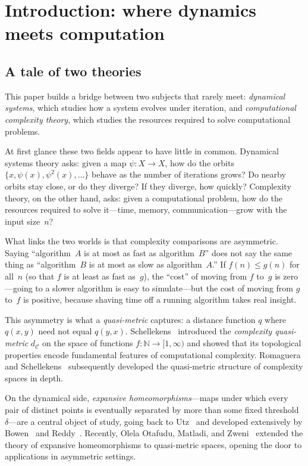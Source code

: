 \documentclass[11pt,a4paper]{article}
\theoremstyle{plain}
\theoremstyle{definition}
\newcommand{\N}{\mathbb{N}}
\newcommand{\C}{\mathcal{C}}
\begin{document}
\section{Introduction: where dynamics meets computation}
\label{sec:intro}

\subsection{A tale of two theories}

This paper builds a bridge between two subjects that rarely meet:
\emph{dynamical systems}, which studies how a system evolves under
iteration, and \emph{computational complexity theory}, which studies
the resources required to solve computational problems.

At first glance these two fields appear to have little in common.
Dynamical systems theory asks: given a map $\psi\colon X\to X$,
how do the orbits $\{x,\psi(x),\psi^2(x),\ldots\}$ behave as the
number of iterations grows?  Do nearby orbits stay close, or do they
diverge?  If they diverge, how quickly?  Complexity theory, on the
other hand, asks: given a computational problem, how do the resources
required to solve it---time, memory, communication---grow with the
input size~$n$?

What links the two worlds is that complexity comparisons are
asymmetric.  Saying ``algorithm~$A$ is at most as fast as
algorithm~$B$'' does not say the same thing as ``algorithm~$B$
is at most as slow as algorithm~$A$.''  If $f(n)\le g(n)$ for
all~$n$ (so that $f$ is at least as fast as~$g$), the ``cost'' of
moving from $f$ to~$g$ is zero---going to a slower algorithm is
easy to simulate---but the cost of moving from $g$ to~$f$ is
positive, because shaving time off a running algorithm takes real
insight.

This asymmetry is what a \emph{quasi-metric} captures: a distance
function $q$ where $q(x,y)$ need not equal $q(y,x)$.  Schellekens~\cite{schellekens1995} introduced the
\emph{complexity quasi-metric} $d_\C$ on the space of functions
$f\colon\N\to[1,\infty)$ and showed that its topological properties
encode fundamental features of computational complexity.  Romaguera
and Schellekens~\cite{romaguera1999} subsequently developed the
quasi-metric structure of complexity spaces in depth.

On the dynamical side, \emph{expansive homeomorphisms}---maps under
which every pair of distinct points is eventually separated by more
than some fixed threshold~$\delta$---are a central object of study,
going back to Utz~\cite{utz1950} and developed extensively by
Bowen~\cite{bowen1975} and Reddy~\cite{reddy1983}.  Recently, Olela
Otafudu, Matladi, and Zweni~\cite{olela2024} extended the theory of
expansive homeomorphisms to quasi-metric spaces, opening the door to
applications in asymmetric settings.
\end{document}
